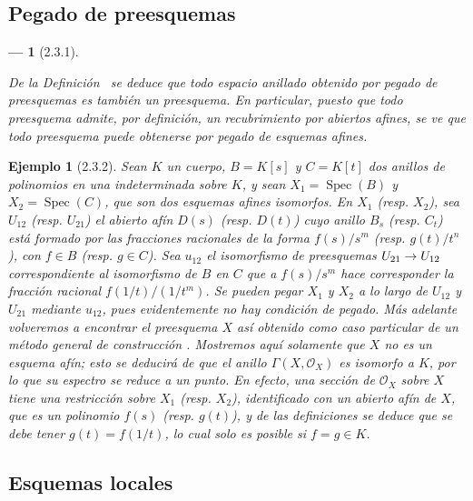 \documentclass[oneside]{amsart}
\theoremstyle{ega-env-style}
\newtheorem*{env}{---}
\theoremstyle{ega-thm-env-style}
\theoremstyle{ega-defn-env-style}
\newtheorem*{example}{Ejemplo}
\renewcommand{\to}{\mathchoice{\longrightarrow}{\rightarrow}{\rightarrow}{\rightarrow}}
\newcommand{\oldpage}[2][]{{\marginnote{\normalfont{\textbf{#1}~|~#2}}}\ignorespaces}
\let\EGAOriginalLabel\label
\renewcommand{\label}[1]{\phantomsection\EGAOriginalLabel{#1}}
\begin{document}
\oldpage[I]{101}
\subsection{Pegado de preesquemas}
\label{subsection:I.2.3}

\begin{env}[2.3.1]
\label{I.2.3.1}

De la Definición~ se deduce que todo espacio anillado obtenido por \emph{pegado} de preesquemas  es también un preesquema.
En particular, puesto que todo preesquema admite, por definición, un recubrimiento por abiertos afines, se ve que todo preesquema puede obtenerse por \emph{pegado de esquemas afines}.
\end{env}

\begin{example}[2.3.2]
\label{I.2.3.2}
Sean $K$ un cuerpo, $B=K[s]$ y $C=K[t]$ dos anillos de polinomios en una indeterminada sobre $K$, y sean $X_1=\operatorname{Spec}(B)$ y $X_2=\operatorname{Spec}(C)$, que son dos esquemas afines isomorfos.
En $X_1$ (resp. $X_2$), sea $U_{12}$ (resp. $U_{21}$) el abierto afín $D(s)$ (resp. $D(t)$) cuyo anillo $B_s$ (resp. $C_t$) está formado por las fracciones racionales de la forma $f(s)/s^m$ (resp. $g(t)/t^n$), con $f\in B$ (resp. $g\in C$).
Sea $u_{12}$ el isomorfismo de preesquemas $U_{21}\to U_{12}$ correspondiente  al isomorfismo de $B$ en $C$ que a $f(s)/s^m$ hace corresponder la fracción racional $f(1/t)/(1/t^m)$.
Se pueden pegar $X_1$ y $X_2$ a lo largo de $U_{12}$ y $U_{21}$ mediante $u_{12}$, pues evidentemente no hay condición de pegado.
Más adelante volveremos a encontrar el preesquema $X$ así obtenido como caso particular de un método general de construcción .
Mostremos aquí solamente que $X$ \emph{no es un esquema afín};
esto se deducirá de que el anillo $\Gamma(X,\mathscr{O}_X)$ es \emph{isomorfo a} $K$, por lo que su espectro se reduce a un punto.
En efecto, una sección de $\mathscr{O}_X$ sobre $X$ tiene una restricción sobre $X_1$ (resp. $X_2$), identificado con un abierto afín de $X$, que es un polinomio $f(s)$ (resp. $g(t)$), y de las definiciones se deduce que se debe tener $g(t)=f(1/t)$, lo cual solo es posible si $f=g\in K$.
\end{example}

\subsection{Esquemas locales}
\label{subsection:I.2.4}
\end{document}
